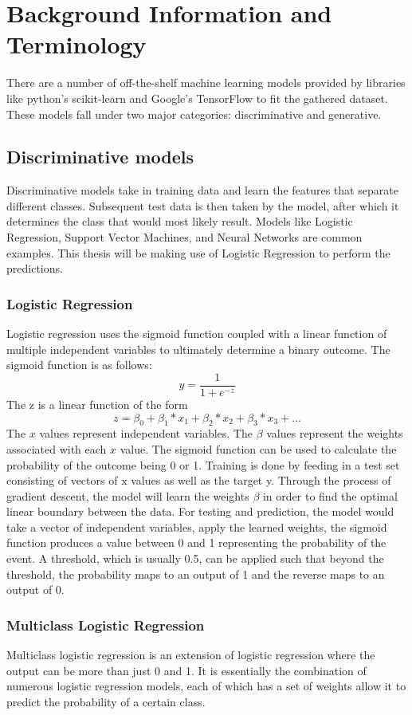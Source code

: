\documentclass[12pt]{article}
\begin{document}
\newpage
\section{Background Information and Terminology}
There are a number of off-the-shelf machine learning models provided by libraries like python's scikit-learn and Google's TensorFlow to fit the gathered dataset. These models fall under two major categories: discriminative and generative. 

\subsection{Discriminative models}
Discriminative models take in training data and learn the features that separate different classes. Subsequent test data is then taken by the model, after which it determines the class that would most likely result. Models like Logistic Regression, Support Vector Machines, and Neural Networks are common examples. This thesis will be making use of Logistic Regression to perform the predictions. 

\subsubsection{Logistic Regression}
Logistic regression uses the sigmoid function coupled with a linear function of multiple independent variables to ultimately determine a binary outcome. The sigmoid function is as follows: 
\[y = \frac{1}{1+e^{-z}}\]
The z is a linear function of the form
\[z = \beta_0 + \beta_1*x_1 + \beta_2*x_2 + \beta_3*x_3  + ...\]
The \(x\) values represent independent variables. The \(\beta\) values represent the weights associated with each \(x\) value. The sigmoid function can be used to calculate the probability of the outcome being 0 or 1. Training is done by feeding in a test set consisting of vectors of x values as well as the target y. Through the process of gradient descent, the model will learn the weights \(\beta\) in order to find the optimal linear boundary between the data. For testing and prediction, the model would take a vector of independent variables, apply the learned weights, the sigmoid function produces a value between 0 and 1 representing the probability of the event. A threshold, which is usually 0.5, can be applied such that beyond the threshold, the probability maps to an output of 1 and the reverse maps to an output of 0. 

\subsubsection{Multiclass Logistic Regression}
Multiclass logistic regression is an extension of logistic regression where the output can be more than just 0 and 1. It is essentially the combination of numerous logistic regression models, each of which has a set of weights allow it to predict the probability of a certain class. 
\end{document}

